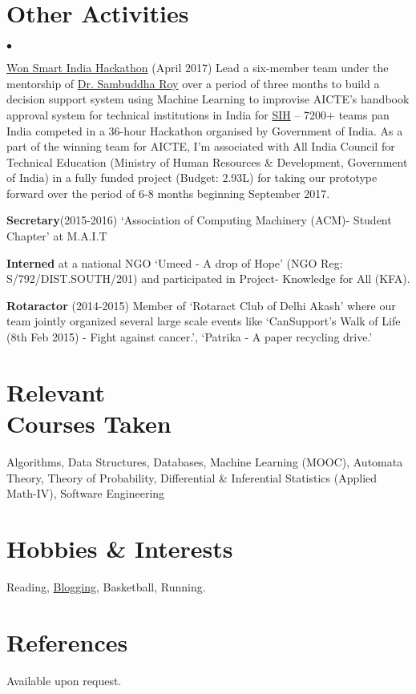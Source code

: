 \documentclass[margin,line]{res}
\newenvironment{list2}{
  \begin{list}{$\bullet$}{%
      \setlength{\itemsep}{0in}
      \setlength{\parsep}{0in} \setlength{\parskip}{0in}
      \setlength{\topsep}{0in} \setlength{\partopsep}{0in}
      \setlength{\leftmargin}{0.2in}}}{\end{list}}
\begin{document}
\begin{resume}
\section{\sc Other Activities}
\begin{list2}
\item {\href{https://www.linkedin.com/feed/update/urn:li:activity:6255398180318470144}{\color{blue} Won Smart India Hackathon}} (April 2017)  Lead a six-member team under the mentorship of {\href{https://www.linkedin.com/in/sambuddharoy/}{\color{blue} Dr. Sambuddha Roy}} over a period of three months to build a decision support system using Machine Learning to improvise AICTE's handbook approval system for technical institutions in India for {\href{https://www.linkedin.com/pulse/smart-india-hackathon-2017-anirban-sarker}{\color{blue} SIH}} -- 7200+ teams pan India competed in a 36-hour Hackathon organised by Government of India. As a part of the winning team for AICTE, I'm associated with All India Council for Technical Education (Ministry of Human Resources \& Development, Government of India) in a fully funded project (Budget: 2.93L) for taking our prototype forward over the period of 6-8 months beginning September 2017. 
\item {\bf Secretary}(2015-2016)  `Association of Computing Machinery (ACM)- Student Chapter' at M.A.I.T
\item {\bf Interned} at a national NGO `Umeed - A drop of Hope' (NGO Reg: S/792/DIST.SOUTH/201) and participated in Project- Knowledge for All (KFA).
\item {\bf Rotaractor} (2014-2015) Member of `Rotaract Club of Delhi Akash' where our team jointly organized several large scale events like `CanSupport's Walk of Life (8th Feb 2015) - Fight against cancer.', 
`Patrika - A paper recycling drive.'
\end{list2}

\section{\sc Relevant \\Courses Taken}
Algorithms, Data Structures, Databases, Machine Learning (MOOC), Automata Theory, Theory of Probability, Differential \& Inferential Statistics (Applied Math-IV), Software Engineering

\section{\sc Hobbies \& Interests}
Reading, {\href{http://www.swadhwa.me/blog/}{\color{blue} Blogging}}, Basketball, Running.
\section{\sc References }
Available upon request.
\end{resume}
\end{document}
